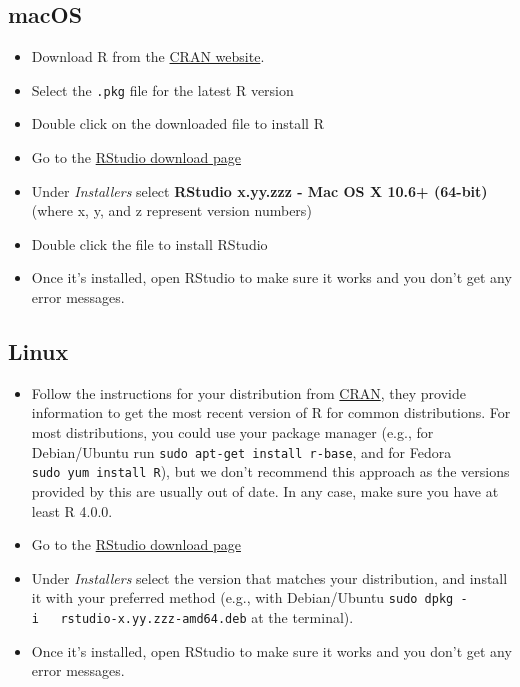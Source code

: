 \documentclass[
]{book}
\providecommand{\tightlist}{%
  \setlength{\itemsep}{0pt}\setlength{\parskip}{0pt}}
\begin{document}
\hypertarget{macos}{%
\subsection*{macOS}\label{macos}}

\begin{itemize}
\tightlist
\item
  Download R from
  the \href{http://cran.r-project.org/bin/macosx}{CRAN website}.
\item
  Select the \texttt{.pkg} file for the latest R version
\item
  Double click on the downloaded file to install R
\item
  Go to the \href{https://www.rstudio.com/products/rstudio/download/\#download}{RStudio download page}
\item
  Under \emph{Installers} select \textbf{RStudio x.yy.zzz - Mac OS X 10.6+ (64-bit)}
  (where x, y, and z represent version numbers)
\item
  Double click the file to install RStudio
\item
  Once it's installed, open RStudio to make sure it works and you don't get any
  error messages.
\end{itemize}

\hypertarget{linux}{%
\subsection*{Linux}\label{linux}}

\begin{itemize}
\tightlist
\item
  Follow the instructions for your distribution
  from \href{https://cloud.r-project.org/bin/linux}{CRAN}, they provide information
  to get the most recent version of R for common distributions. For most
  distributions, you could use your package manager (e.g., for Debian/Ubuntu run
  \texttt{sudo\ apt-get\ install\ r-base}, and for Fedora \texttt{sudo\ yum\ install\ R}), but we
  don't recommend this approach as the versions provided by this are
  usually out of date. In any case, make sure you have at least R 4.0.0.
\item
  Go to the
  \href{https://www.rstudio.com/products/rstudio/download/\#download}{RStudio download page}
\item
  Under \emph{Installers} select the version that matches your distribution, and
  install it with your preferred method (e.g., with Debian/Ubuntu \texttt{sudo\ dpkg\ -i\ \ \ rstudio-x.yy.zzz-amd64.deb} at the terminal).
\item
  Once it's installed, open RStudio to make sure it works and you don't get any
  error messages.
\end{itemize}
\end{document}
